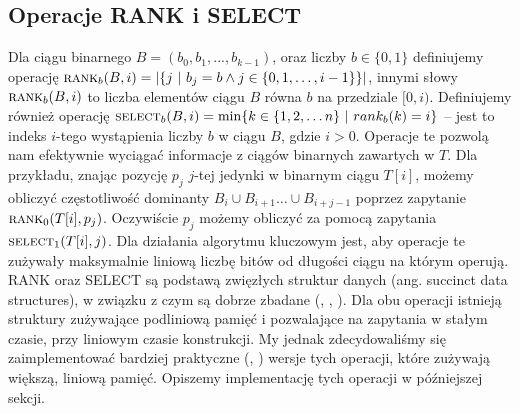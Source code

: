 \subsection{Operacje \textsc{RANK} i \textsc{SELECT}}
Dla ciągu binarnego $B=(b_0,b_1,...,b_{k-1})$, oraz liczby $b \in \{0, 1\}$ definiujemy operację $\textsc{rank}_b(B,i) = |\{j\ |\ b_j=b \land j \in \{0, 1, \dots, i-1\}\}|$, innymi słowy $\textsc{rank}_b(B,i)$ to liczba elementów ciągu $B$ równa $b$ na przedziale $[0, i)$. Definiujemy również operację $\textsc{select}_b(B, i) = \min\{k \in \{1, 2, \dots n\}\ | \ rank_b(k)=i\}$ -- jest to indeks $i$-tego wystąpienia liczby $b$ w ciągu $B$, gdzie $i > 0$. Operacje te pozwolą nam efektywnie wyciągać informacje z ciągów binarnych zawartych w $T$. Dla przykładu, znając pozycję $p_j$ $j$-tej jedynki w binarnym ciągu $T[i]$, możemy obliczyć częstotliwość dominanty $B_i \cup B_{i+1} \dots \cup B_{i+j-1}$ poprzez zapytanie $\textsc{rank}_0(T[i],p_j)$. Oczywiście $p_j$ możemy obliczyć za pomocą zapytania $\textsc{select}_1(T[i], j)$. Dla działania algorytmu kluczowym jest, aby operacje te zużywały maksymalnie liniową liczbę bitów od długości ciągu na którym operują. \textsc{RANK} oraz \textsc{SELECT} są podstawą zwięzłych struktur danych (ang. succinct data structures), w związku z czym są dobrze zbadane (\cite{jaco89}, \cite{clar97}, \cite{rama07}). Dla obu operacji istnieją struktury zużywające podliniową pamięć i pozwalające na zapytania w stałym czasie, przy liniowym czasie konstrukcji. My jednak zdecydowaliśmy się zaimplementować bardziej praktyczne (\cite{vign08}, \cite{nakp09}) wersje tych operacji, które zużywają większą, liniową pamięć. Opiszemy implementację tych operacji w późniejszej sekcji.

